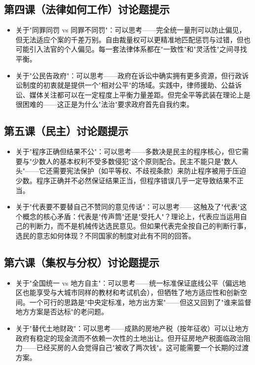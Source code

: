 \documentclass[a4paper,12pt]{ctexart}
\begin{document}
\subsection*{第四课（法律如何工作）讨论题提示}
\begin{itemize}
  \item 关于"同罪同罚 vs 同罪不同罚"：可以思考——完全统一量刑可以防止偏见，但无法适应个案的千差万别。自由裁量权可以更精准地匹配惩罚与过错，但也可能引入法官的个人偏见。每一套法律体系都在"一致性"和"灵活性"之间寻找平衡。
  \item 关于"公民告政府"：可以思考——政府在诉讼中确实拥有更多资源，但行政诉讼制度的初衷就是提供一个"相对公平"的场域。实践中，律师援助、公益诉讼、媒体关注都可以在一定程度上平衡力量差距。但完全平等武装在理论上是很困难的——这正是为什么"法治"要求政府首先自我约束。
\end{itemize}

\subsection*{第五课（民主）讨论题提示}
\begin{itemize}
  \item 关于"程序正确但结果不公"：可以思考——多数决是民主的程序核心，但它需要与"少数人的基本权利不受多数侵犯"这个原则配合。民主不能只是"数人头"——它还需要宪法保护（如平等权、不歧视条款）来防止程序被用于压迫少数。程序正确并不必然保证结果正当，但程序错误几乎一定导致结果不正当。
  \item 关于"代表要不要替自己不赞同的意见传话"：可以思考——这触及了"代表"这个概念的核心矛盾：代表是"传声筒"还是"受托人"？理论上，代表应当运用自己的判断力，而不是机械传达选民意见。但如果代表完全按自己的判断行事，选民的意志如何体现？不同国家的制度对此有不同的回答。
\end{itemize}

\subsection*{第六课（集权与分权）讨论题提示}
\begin{itemize}
  \item 关于"全国统一 vs 地方自主"：可以思考——统一标准保证底线公平（偏远地区也能享受与大城市同样的教材和考试机会），但牺牲了地方适应性和创新空间。一个可行的思路是"中央定标准，地方出方案"——但这又回到了"谁来监督地方方案是否达标"的老问题。
  \item 关于"替代土地财政"：可以思考——成熟的房地产税（按年征收）可以让地方政府有稳定的现金流而不依赖一次性的土地出让。但开征房地产税面临政治阻力——已经买房的人会觉得自己"被收了两次钱"。这可能需要一个长期的过渡方案。
\end{itemize}
\end{document}
